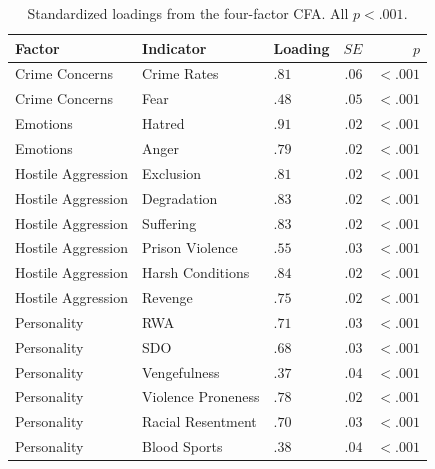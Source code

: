\begin{table}[htbp]
  \centering
  \caption{Standardized loadings from the four-factor CFA. All $p < .001$.}
  \label{tab:cfa_loadings}
  \small
  \begin{tabular}{lll r r}
    \toprule
    Factor & Indicator & Loading & $SE$ & $p$ \\
    \midrule
    Crime Concerns       & Crime Rates       & $.81$ & $.06$ & $<.001$ \\
    Crime Concerns       & Fear              & $.48$ & $.05$ & $<.001$ \\
    Emotions             & Hatred            & $.91$ & $.02$ & $<.001$ \\
    Emotions             & Anger             & $.79$ & $.02$ & $<.001$ \\
    Hostile Aggression   & Exclusion         & $.81$ & $.02$ & $<.001$ \\
    Hostile Aggression   & Degradation       & $.83$ & $.02$ & $<.001$ \\
    Hostile Aggression   & Suffering         & $.83$ & $.02$ & $<.001$ \\
    Hostile Aggression   & Prison Violence   & $.55$ & $.03$ & $<.001$ \\
    Hostile Aggression   & Harsh Conditions  & $.84$ & $.02$ & $<.001$ \\
    Hostile Aggression   & Revenge           & $.75$ & $.02$ & $<.001$ \\
    Personality          & RWA               & $.71$ & $.03$ & $<.001$ \\
    Personality          & SDO               & $.68$ & $.03$ & $<.001$ \\
    Personality          & Vengefulness      & $.37$ & $.04$ & $<.001$ \\
    Personality          & Violence Proneness & $.78$ & $.02$ & $<.001$ \\
    Personality          & Racial Resentment & $.70$ & $.03$ & $<.001$ \\
    Personality          & Blood Sports      & $.38$ & $.04$ & $<.001$ \\
    \bottomrule
  \end{tabular}
\end{table}

